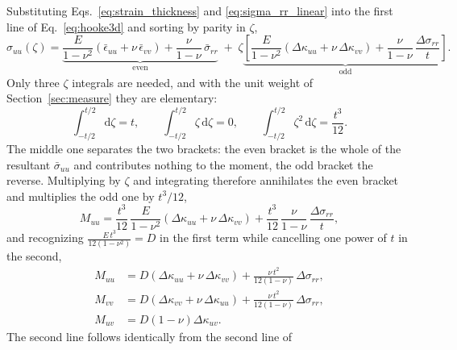 \documentclass[11pt]{article}
\begin{document}
Substituting Eqs.~\eqref{eq:strain_thickness} and \eqref{eq:sigma_rr_linear} into
the first line of Eq.~\eqref{eq:hooke3d} and sorting by parity in $\zeta$,
\begin{equation}\label{eq:sigma_uu_of_zeta}
    \sigma_{uu}\left(\zeta\right) =
      \underbrace{\frac{E}{1-\nu^{2}}
        \left(\bar\epsilon_{uu} + \nu\,\bar\epsilon_{vv}\right)
        + \frac{\nu}{1-\nu}\,\bar\sigma_{rr}}_{\text{even}}
      \;+\; \zeta\underbrace{\left[\frac{E}{1-\nu^{2}}
        \left(\Delta\kappa_{uu} + \nu\,\Delta\kappa_{vv}\right)
        + \frac{\nu}{1-\nu}\,\frac{\Delta\sigma_{rr}}{t}\right]}
        _{\text{odd}}.
\end{equation}
Only three $\zeta$ integrals are needed, and with the unit weight of
Section~\ref{sec:measure} they are elementary:
\begin{equation}\label{eq:zeta_moments}
    \int_{-t/2}^{t/2}\mathrm d\zeta = t,
    \qquad
    \int_{-t/2}^{t/2}\zeta\,\mathrm d\zeta = 0,
    \qquad
    \int_{-t/2}^{t/2}\zeta^{2}\,\mathrm d\zeta = \frac{t^{3}}{12}.
\end{equation}
The middle one separates the two brackets: the even bracket is the whole of the
resultant $\bar\sigma_{uu}$ and contributes nothing to the moment, the odd
bracket the reverse. Multiplying by $\zeta$ and integrating therefore annihilates
the even bracket and multiplies the odd one by $t^{3}/12$,
\begin{equation}\label{eq:moment_integral}
    M_{uu} = \frac{t^{3}}{12}\,\frac{E}{1-\nu^{2}}
      \left(\Delta\kappa_{uu} + \nu\,\Delta\kappa_{vv}\right)
      + \frac{t^{3}}{12}\,\frac{\nu}{1-\nu}\,\frac{\Delta\sigma_{rr}}{t},
\end{equation}
and recognizing $\frac{E\,t^{3}}{12\left(1-\nu^{2}\right)} = D$ in the first term
while cancelling one power of $t$ in the second,
\begin{equation}\label{eq:moment_derived}
    \boxed{\;
    \begin{aligned}
    M_{uu} &= D\left(\Delta\kappa_{uu} + \nu\,\Delta\kappa_{vv}\right)
      + \frac{\nu\,t^{2}}{12\left(1-\nu\right)}\,\Delta\sigma_{rr},\\
    M_{vv} &= D\left(\Delta\kappa_{vv} + \nu\,\Delta\kappa_{uu}\right)
      + \frac{\nu\,t^{2}}{12\left(1-\nu\right)}\,\Delta\sigma_{rr},\\
    M_{uv} &= D\left(1-\nu\right)\Delta\kappa_{uv}.
    \end{aligned}\;}
\end{equation}
The second line follows identically from the second line of
\end{document}
